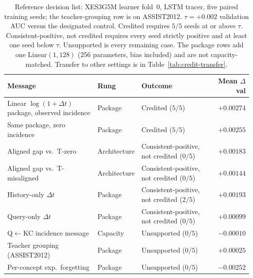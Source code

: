 \begin{table}[t]
\caption{Reference decision list: XES3G5M learner fold~0, LSTM tracer,
five paired training seeds; the teacher-grouping row is on ASSIST2012. $\tau{=}{+}0.002$ validation AUC versus the designated control.
Credited requires $5/5$ seeds at or above $\tau$. Consistent-positive,
not credited requires every seed strictly positive and at least one seed
below $\tau$. Unsupported is every remaining case. The package rows add
one $\mathrm{Linear}(1,128)$ (256 parameters, bias included) and are not
capacity-matched. Transfer to other settings is in
Table~\ref{tab:credit-transfer}.}
\label{tab:credit-decisions}
\centering
\footnotesize
\setlength{\tabcolsep}{3pt}
\begin{tabularx}{\textwidth}{@{}>{\raggedright\arraybackslash}p{3.3cm}
>{\raggedright\arraybackslash}p{2.5cm}
>{\raggedright\arraybackslash}X
r@{}}
\toprule
Message & Rung & Outcome & Mean $\Delta$val \\
\midrule
Linear $\log(1{+}\Delta t)$ package, observed incidence &
Package & Credited ($5/5$) & $+0.00274$ \\
Same package, zero incidence &
Package & Credited ($5/5$) & $+0.00255$ \\
Aligned gap vs.\ T-zero &
Architecture & Consistent-positive, not credited ($0/5$) & $+0.00183$ \\
Aligned gap vs.\ T-misaligned &
Architecture & Consistent-positive, not credited ($0/5$) & $+0.00144$ \\
History-only $\Delta t$ &
Package & Consistent-positive, not credited ($2/5$) & $+0.00193$ \\
Query-only $\Delta t$ &
Package & Consistent-positive, not credited ($0/5$) & $+0.00099$ \\
Q$\leftarrow$KC incidence message &
Capacity & Unsupported ($0/5$) & $-0.00010$ \\
Teacher grouping (ASSIST2012) &
Package & Unsupported ($0/5$) & $+0.00025$ \\
Per-concept exp.\ forgetting &
Package & Unsupported ($0/5$) & $-0.00252$ \\
\bottomrule
\end{tabularx}
\end{table}
